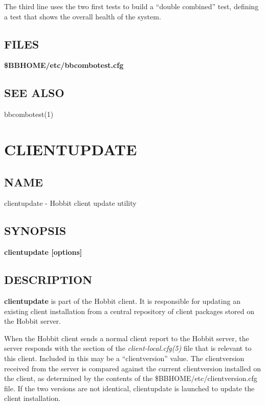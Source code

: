   The third line uses the two first tests to build a ``double
  combined'' test, defining a test that shows the overall health of
  the system. 

 
\subsection{FILES}
\textbf{\$BBHOME/etc/bbcombotest.cfg}

 
\subsection{SEE ALSO}
bbcombotest(1) 


%
\newpage
\section{CLIENTUPDATE}


\subsection{NAME}
 clientupdate - Hobbit client update utility \subsection{SYNOPSIS}
\textbf{clientupdate [options]}


 
\subsection{DESCRIPTION}
\textbf{clientupdate}
 is part of the Hobbit client. It is responsible for updating an existing client installation from a central repository of client packages stored on the Hobbit server. 

  When the Hobbit client sends a normal client report to the Hobbit server, the server responds with the section of the \emph{client-local.cfg(5)}
 file that is relevant to this client. Included in this may be a ``clientversion'' value. The clientversion received from the server is compared against the current clientversion installed on the client, as determined by the contents of the \$BBHOME/etc/clientversion.cfg file. If the two versions are not identical, clientupdate is launched to update the client installation. 


